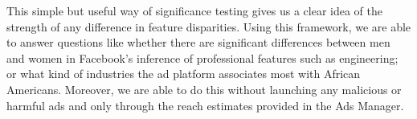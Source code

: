 This simple but useful way of significance testing gives us a clear idea of the strength of any difference in feature disparities. Using this framework, we are able to answer questions like whether there are significant differences between men and women in Facebook's inference of professional features such as engineering; or what kind of industries the ad platform associates most with African Americans. Moreover, we are able to do this without launching any malicious or harmful ads and only through the reach estimates provided in the Ads Manager.